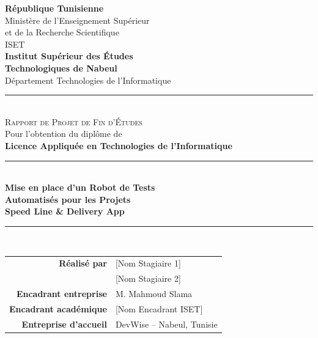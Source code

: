 \begin{center}

  \vspace*{0.5cm}

  {\large \textbf{R\'{e}publique Tunisienne}}\\[4pt]
  {\large Minist\`{e}re de l'Enseignement Sup\'{e}rieur\\
  et de la Recherche Scientifique}\\[0.8cm]

  {\Large \textsc{ISET}}\\[0.3cm]

  {\LARGE \textbf{Institut Sup\'{e}rieur des \'{E}tudes\\[4pt]
  Technologiques de Nabeul}}\\[0.4cm]

  {\large D\'{e}partement Technologies de l'Informatique}\\[0.8cm]

  \rule{0.6\textwidth}{0.8pt}\\[0.8cm]

  {\Large \textsc{Rapport de Projet de Fin d'\'{E}tudes}}\\[0.4cm]

  {\large Pour l'obtention du dipl\^{o}me de}\\[0.2cm]
  {\Large \textbf{Licence Appliqu\'{e}e en Technologies de l'Informatique}}\\[0.8cm]

  \rule{0.6\textwidth}{0.8pt}\\[0.8cm]

  {\huge \textbf{Mise en place d'un Robot de Tests\\[6pt]
  Automatis\'{e}s pour les Projets\\[6pt]
  Speed Line \& Delivery App}}\\[1.2cm]

  \rule{0.4\textwidth}{0.5pt}\\[1cm]

  \begin{tabular}{r @{\hspace{0.5cm}:\hspace{0.5cm}} l}
    \textbf{R\'{e}alis\'{e} par}        & [Nom Stagiaire 1] \\[4pt]
                                         & [Nom Stagiaire 2] \\[10pt]
    \textbf{Encadrant entreprise}        & M. Mahmoud Slama \\[4pt]
    \textbf{Encadrant acad\'{e}mique}    & [Nom Encadrant ISET] \\[10pt]
    \textbf{Entreprise d'accueil}        & DevWise -- Nabeul, Tunisie \\[4pt]
  \end{tabular}


\end{center}
